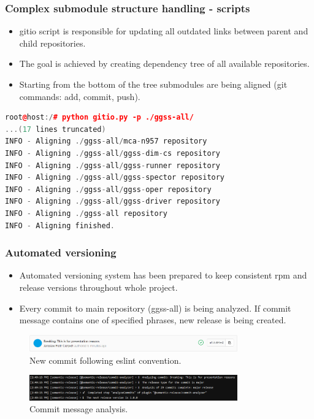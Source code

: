 \documentclass[10pt]{beamer}
\begin{document}
\begin{frame}[fragile]
\frametitle{Complex submodule structure handling - scripts}
\begin{itemize}
\item gitio script is responsible for updating all outdated links between parent and child repositories.
\item The goal is achieved by creating dependency tree of all available repositories.
\item Starting from the bottom of the tree submodules are being aligned (git commands: add, commit, push).
\end{itemize}
\begin{lstlisting}[language=c++, caption={Gitio in action.}]
root@host:/# python gitio.py -p ./ggss-all/
...(17 lines truncated)
INFO - Aligning ./ggss-all/mca-n957 repository
INFO - Aligning ./ggss-all/ggss-dim-cs repository
INFO - Aligning ./ggss-all/ggss-runner repository
INFO - Aligning ./ggss-all/ggss-spector repository
INFO - Aligning ./ggss-all/ggss-oper repository
INFO - Aligning ./ggss-all/ggss-driver repository
INFO - Aligning ./ggss-all repository
INFO - Aligning finished.
\end{lstlisting}
\end{frame}


\begin{frame}[fragile]
\frametitle{Automated versioning}
\begin{itemize}
\item Automated versioning system has been prepared to keep consistent rpm and release versions throughout whole project.
\item Every commit to main repository (ggss-all) is being analyzed. If commit message contains one of specified phrases, new release is being created.
\end{itemize}
\begin{figure}
    \centering
    \includegraphics[width=0.8\textwidth]{resources/commit.PNG}
    \caption{New commit following eslint convention.}
\end{figure}
\begin{figure}
    \centering
    \includegraphics[width=0.8\textwidth]{resources/commit_message_analyze.PNG}
    \caption{Commit message analysis.}
\end{figure}

\end{frame}
\end{document}
